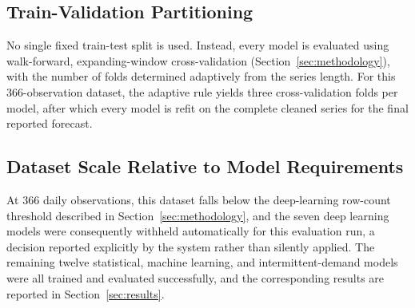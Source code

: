 \subsection{Train-Validation Partitioning}
No single fixed train-test split is used. Instead, every model is evaluated using walk-forward, expanding-window cross-validation (Section~\ref{sec:methodology}), with the number of folds determined adaptively from the series length. For this 366-observation dataset, the adaptive rule yields three cross-validation folds per model, after which every model is refit on the complete cleaned series for the final reported forecast.

\subsection{Dataset Scale Relative to Model Requirements}
At 366 daily observations, this dataset falls below the deep-learning row-count threshold described in Section~\ref{sec:methodology}, and the seven deep learning models were consequently withheld automatically for this evaluation run, a decision reported explicitly by the system rather than silently applied. The remaining twelve statistical, machine learning, and intermittent-demand models were all trained and evaluated successfully, and the corresponding results are reported in Section~\ref{sec:results}.
